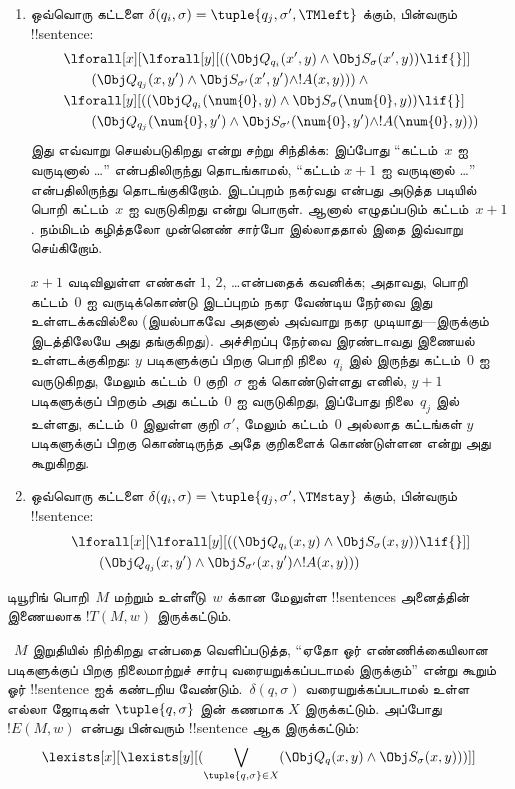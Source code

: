 \documentclass[../../../include/open-logic-section]{subfiles}
\begin{document}
\begin{enumerate}
\begin{enumerate}
\item {} ஒவ்வொரு கட்டளை $\delta(q_i, \sigma) =
  \tuple{q_j, \sigma', \TMleft}$ க்கும், பின்வரும் !!{sentence}:
\begin{align*}
& \lforall[x][\lforall[y][
    ((\Obj Q_{q_i}(x', y) \land \Obj S_{\sigma}(x', y)) \lif {}]]\\
& \qquad   (\Obj Q_{q_j}(x, y') \land \Obj S_{\sigma'}(x', y') \land
!A(x, y))) \land {}\\
& \lforall[y][((\Obj Q_{q_i}(\num{0}, y) \land \Obj S_{\sigma}(\num{0},
    y)) \lif {}]\\
& \qquad (\Obj Q_{q_j}(\num{0}, y') \land \Obj S_{\sigma'}(\num{0},
  y') \land !A(\num{0}, y)))
\end{align*}
இது எவ்வாறு செயல்படுகிறது என்று சற்று சிந்திக்க: இப்போது
``கட்டம்~$x$ ஐ வருடினால் \dots'' என்பதிலிருந்து தொடங்காமல்,
``கட்டம் $x+1$ ஐ வருடினால் \dots'' என்பதிலிருந்து தொடங்குகிறோம்.
இடப்புறம் நகர்வது என்பது அடுத்த படியில் பொறி கட்டம்~$x$ ஐ வருடுகிறது
என்று பொருள். ஆனால் எழுதப்படும் கட்டம்~$x+1$. நம்மிடம் கழித்தலோ
முன்னெண் சார்போ இல்லாததால் இதை இவ்வாறு செய்கிறோம்.

$x+1$ வடிவிலுள்ள எண்கள் $1$, $2$, \dots என்பதைக் கவனிக்க; அதாவது,
பொறி கட்டம்~$0$ ஐ வருடிக்கொண்டு இடப்புறம் நகர வேண்டிய நேர்வை இது
உள்ளடக்கவில்லை (இயல்பாகவே அதனால் அவ்வாறு நகர முடியாது---இருக்கும்
இடத்திலேயே அது தங்குகிறது). அச்சிறப்பு நேர்வை இரண்டாவது இணையல்
உள்ளடக்குகிறது: $y$ படிகளுக்குப் பிறகு பொறி நிலை~$q_i$ இல் இருந்து
கட்டம்~$0$ ஐ வருடுகிறது, மேலும் கட்டம்~$0$ குறி~$\sigma$ ஐக்
கொண்டுள்ளது எனில், $y+1$ படிகளுக்குப் பிறகும் அது கட்டம்~$0$ ஐ
வருடுகிறது, இப்போது நிலை~$q_j$ இல் உள்ளது, கட்டம்~$0$ இலுள்ள குறி
$\sigma'$, மேலும் கட்டம்~$0$ அல்லாத கட்டங்கள் $y$ படிகளுக்குப்
பிறகு கொண்டிருந்த அதே குறிகளைக் கொண்டுள்ளன என்று அது கூறுகிறது.
\item {} ஒவ்வொரு கட்டளை $\delta(q_i, \sigma) =
  \tuple{q_j, \sigma', \TMstay}$ க்கும், பின்வரும் !!{sentence}:
\begin{align*}
& \lforall[x][\lforall[y][(
   (\Obj Q_{q_i}(x, y) \land \Obj S_{\sigma}(x, y)) \lif {}]] \\
&\qquad   (\Obj Q_{q_j}(x, y') \land \Obj S_{\sigma'}(x, y') \land
!A(x, y)))
\end{align*}
\end{enumerate}
\end{enumerate}
டியூரிங் பொறி~$M$ மற்றும் உள்ளீடு~$w$ க்கான மேலுள்ள
!!{sentence}s அனைத்தின் இணையலாக $!T(M, w)$ இருக்கட்டும்.

~$M$ இறுதியில் நிற்கிறது என்பதை வெளிப்படுத்த, ``ஏதோ ஓர்
எண்ணிக்கையிலான படிகளுக்குப் பிறகு நிலைமாற்றுச் சார்பு
வரையறுக்கப்படாமல் இருக்கும்'' என்று கூறும் ஓர் !!{sentence} ஐக்
கண்டறிய வேண்டும்.~$\delta(q, \sigma)$ வரையறுக்கப்படாமல் உள்ள எல்லா
ஜோடிகள் $\tuple{q, \sigma}$ இன் கணமாக $X$ இருக்கட்டும். அப்போது
$!E(M, w)$ என்பது பின்வரும் !!{sentence} ஆக இருக்கட்டும்:
\[
\lexists[x][\lexists[y][(\bigvee_{\tuple{q, \sigma} \in
      X}(\Obj Q_q(x, y) \land \Obj S_\sigma(x, y)))]]
\]
\end{document}
